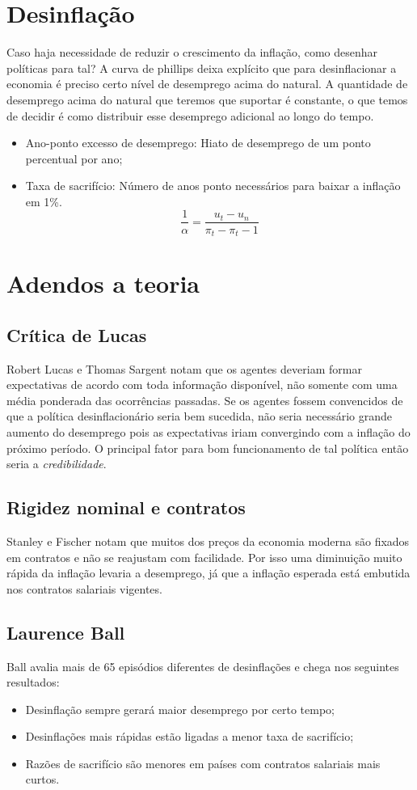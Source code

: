 \documentclass[12pt,a4paper,oneside,brazil]{abntex2}
\begin{document}
\section{Desinflação}
Caso haja necessidade de reduzir o crescimento da inflação, como desenhar políticas para tal? A curva de phillips deixa explícito que para desinflacionar a economia é preciso certo nível de desemprego acima do natural.  A quantidade de desemprego acima do natural que teremos que suportar é constante, o que temos de decidir é como distribuir esse desemprego adicional ao longo do tempo.
\begin{itemize}
\item Ano-ponto excesso de desemprego: Hiato de desemprego de um ponto percentual por ano;
\item Taxa de sacrifício: Número de anos ponto necessários para baixar a inflação em 1\%.
\[ \frac{1}{\alpha} = \frac{u_t - u_n}{\pi_t - \pi_t-1}\]
\end{itemize}

\section{Adendos a teoria}
\subsection{Crítica de Lucas}
Robert Lucas e Thomas Sargent notam que os agentes deveriam formar expectativas de acordo com toda informação disponível, não somente com uma média ponderada das ocorrências passadas. Se os agentes fossem convencidos de que a política desinflacionário seria bem sucedida, não seria necessário grande aumento do desemprego pois as expectativas iriam convergindo com a inflação do próximo período. O principal fator para bom funcionamento de tal política então seria a \emph{credibilidade}.

\subsection{Rigidez nominal e contratos}
Stanley e Fischer notam que muitos dos preços da economia moderna são fixados em contratos e não se reajustam com facilidade. Por isso uma diminuição muito rápida da inflação levaria a desemprego, já que a inflação esperada está embutida nos contratos salariais vigentes.

\subsection{Laurence Ball}
Ball avalia mais de 65 episódios diferentes de desinflações e chega nos seguintes resultados:
\begin{itemize}
\item Desinflação sempre gerará maior desemprego por certo tempo;
\item Desinflações mais rápidas estão ligadas a menor taxa de sacrifício;
\item Razões de sacrifício são menores em países com contratos salariais mais curtos.
\end{itemize}
\end{document}
